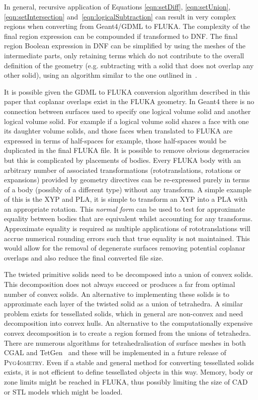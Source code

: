 \documentclass[final,5p,times,twocolumn]{elsarticle}
\newcommand{\PYGEOMETRY}{\textsc{Pyg4ometry}}
\begin{document}
In general, recursive application of Equations \ref{eqn:setDiff},
\ref{eqn:setUnion}, \ref{eqn:setIntersection}
and~\ref{eqn:logicalSubtraction} can result in very complex regions when
converting from Geant4/GDML to FLUKA. The complexity of the final region
expression can be compounded if transformed to DNF. The final region
Boolean expression in DNF can be simplified by using the meshes of the
intermediate parts, only retaining terms which do not contribute to the
overall definition of the geometry (e.g. subtracting with a solid that
does not overlap any other solid), using an algorithm similar to the one
outlined in~\cite{pruning}.

It is possible given the GDML to FLUKA conversion algorithm described in
this paper that coplanar overlaps exist in the FLUKA geometry.  In Geant4
there is no connection between surfaces used to specify one logical volume
solid and another logical volume solid. For example if a logical volume
solid shares a face with one its daughter volume solids, and those faces
when translated to FLUKA are expressed in terms of half-spaces for example,
those half-spaces would be duplicated in the final FLUKA file.  It is
possible to remove obvious degeneracies but this is complicated by
placements of bodies. Every FLUKA body with an arbitrary number of
associated transformations (rototranslations, rotations or expansions)
provided by geometry directives can be re-expressed purely in terms of a
body (possibly of a different type) without any transform. A simple example
of this is the XYP and PLA, it is simple to transform an XYP into a PLA
with an appropriate rotation. This {\em normal form} can be used to test
for approximate equality between bodies that are equivalent whilst
accounting for any transforms.  Approximate equality is required as
multiple applications of rototranslations will accrue numerical rounding
errors such that true equality is not maintained.  This would allow for the
removal of degenerate surfaces removing potential coplanar overlaps and
also reduce the final converted file size.

The twisted primitive solids need to be decomposed
into a union of convex solids. This decomposition does not always
succeed or produces a far from optimal number of convex solids.
An alternative to implementing these solids is to approximate each
layer of the twisted solid as a union of tetrahedra. A similar problem
exists for tessellated solids, which in general
are non-convex and need decomposition into convex hulls. An alternative
to the computationally expensive convex decomposition is to
create a region formed from the unions of tetrahedra. There are numerous
algorithms for tetrahedralisation of surface meshes in both CGAL and TetGen~\cite{tetgen}
and these will be implemented in a future release of \PYGEOMETRY{}. Even if a stable and general
method for converting tessellated solids exists, it is not efficient to define
tessellated objects in this way.  Memory, body or zone limits might
be reached in FLUKA, thus possibly limiting the size of CAD or STL models which
might be loaded.
\end{document}
